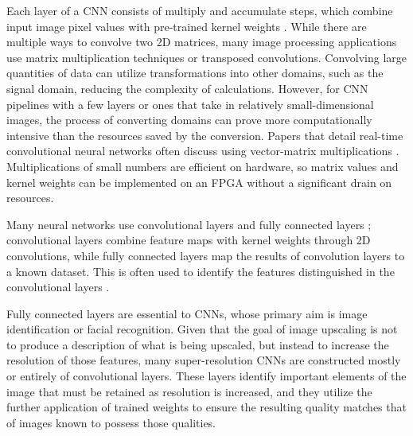\documentclass{article}
\begin{document}
    \par Each layer of a CNN consists of multiply and accumulate steps, which combine input image pixel values with pre-trained kernel weights \cite{ma_scalable_2016}. While there are multiple ways to convolve two 2D matrices, many image processing applications use matrix multiplication techniques or transposed convolutions. Convolving large quantities of data can utilize transformations into other domains, such as the signal domain, reducing the complexity of calculations. However, for CNN pipelines with a few layers or ones that take in relatively small-dimensional images, the process of converting domains can prove more computationally intensive than the resources saved by the conversion. Papers that detail real-time convolutional neural networks often discuss using vector-matrix multiplications \cite{fsrcnn_dong_accelerating_2016}\cite{he_fpga_based_2018}\cite{guo_survey_2018}. Multiplications of small numbers are efficient on hardware, so matrix values and kernel weights can be implemented on an FPGA without a significant drain on resources.
    \par Many neural networks use convolutional layers and fully connected layers \cite{guo_survey_2018}; convolutional layers combine feature maps with kernel weights through 2D convolutions, while fully connected layers map the results of convolution layers to a known dataset. This is often used to identify the features distinguished in the convolutional layers \cite{unzueta_fully_nodate}. 
    \par Fully connected layers are essential to CNNs, whose primary aim is image identification or facial recognition. Given that the goal of image upscaling is not to produce a description of what is being upscaled, but instead to increase the resolution of those features, many super-resolution CNNs are constructed mostly or entirely of convolutional layers. These layers identify important elements of the image that must be retained as resolution is increased, and they utilize the further application of trained weights to ensure the resulting quality matches that of images known to possess those qualities. 
\end{document}
